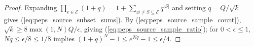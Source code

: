 \begin{proof}\leanok
    Expanding $\prod_{e\in\mathcal E}(1+q)=1+\sum_{\varnothing\ne S\subseteq\mathcal E}q^{|S|}$
    and setting $q=Q/\sqrt k$ gives (\ref{eq:peps_source_subset_sums}). By
    (\ref{eq:peps_source_sample_count}), $\sqrt k\ge 8\max(1,N)Q/\epsilon$, giving
    (\ref{eq:peps_source_sample_ratio}); for $0<\epsilon\le 1$,
    $Nq\le\epsilon/8\le 1/8$ implies $(1+q)^N-1\le e^{Nq}-1\le\epsilon/4$.
\end{proof}
